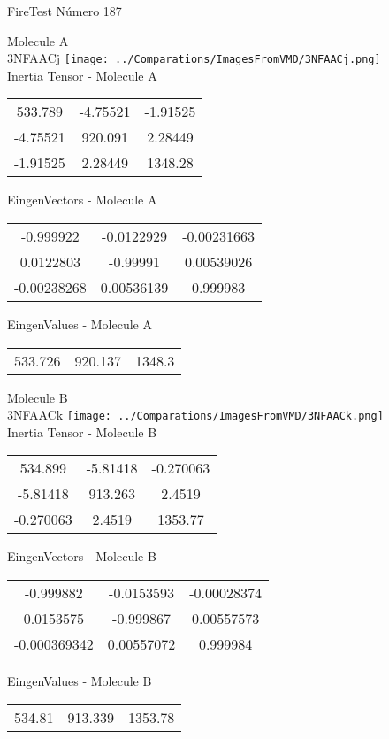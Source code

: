 \vtab[-2cm]
\begin{center}
{\large FireTest \tab Número 187}
\end{center}
\begin{multicols}{2}
\begin{center}

Molecule A \\ 
3NFAACj
\texttt{[image: ../Comparations/ImagesFromVMD/3NFAACj.png]}
\\
Inertia Tensor - Molecule A \\
\vtab

\begin{tabular}{|c c c|}
533.789	 & 	-4.75521	 & 	-1.91525	 \\
-4.75521	 & 	920.091	 & 	2.28449	 \\
-1.91525	 & 	2.28449	 & 	1348.28
\end{tabular}

\vtab
 EingenVectors - Molecule A     \\
\vtab
\begin{tabular}{|c c c|}
-0.999922	 & 	-0.0122929	 & 	-0.00231663	 \\
0.0122803	 & 	-0.99991	 & 	0.00539026	 \\
-0.00238268	 & 	0.00536139	 & 	0.999983
\end{tabular}

\vtab
 EingenValues - Molecule A     \\
\vtab
\begin{tabular}{|c c c|}
533.726	 & 	920.137	 & 	1348.3	 \\
\end{tabular}
\columnbreak

Molecule B \\ 
3NFAACk
\texttt{[image: ../Comparations/ImagesFromVMD/3NFAACk.png]}
\\
Inertia Tensor - Molecule B \\
\vtab

\begin{tabular}{|c c c|}
534.899	 & 	-5.81418	 & 	-0.270063	 \\
-5.81418	 & 	913.263	 & 	2.4519	 \\
-0.270063	 & 	2.4519	 & 	1353.77
\end{tabular}

\vtab
 EingenVectors - Molecule B     \\
\vtab
\begin{tabular}{|c c c|}
-0.999882	 & 	-0.0153593	 & 	-0.00028374	 \\
0.0153575	 & 	-0.999867	 & 	0.00557573	 \\
-0.000369342	 & 	0.00557072	 & 	0.999984
\end{tabular}

\vtab
 EingenValues - Molecule B     \\
\vtab
\begin{tabular}{|c c c|}
534.81	 & 	913.339	 & 	1353.78	 \\
\end{tabular}

\end{center}
\end{multicols}
